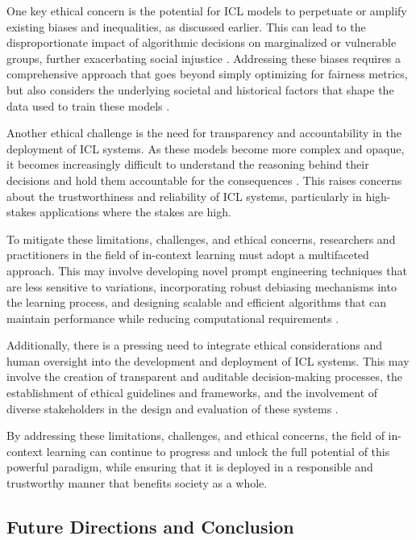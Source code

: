 \documentclass[11pt]{article}
\begin{document}
One key ethical concern is the potential for ICL models to perpetuate or amplify existing biases and inequalities, as discussed earlier. This can lead to the disproportionate impact of algorithmic decisions on marginalized or vulnerable groups, further exacerbating social injustice \cite{ref58,ref59}. Addressing these biases requires a comprehensive approach that goes beyond simply optimizing for fairness metrics, but also considers the underlying societal and historical factors that shape the data used to train these models \cite{ref60}.

Another ethical challenge is the need for transparency and accountability in the deployment of ICL systems. As these models become more complex and opaque, it becomes increasingly difficult to understand the reasoning behind their decisions and hold them accountable for the consequences \cite{ref61,ref62}. This raises concerns about the trustworthiness and reliability of ICL systems, particularly in high-stakes applications where the stakes are high.

To mitigate these limitations, challenges, and ethical concerns, researchers and practitioners in the field of in-context learning must adopt a multifaceted approach. This may involve developing novel prompt engineering techniques that are less sensitive to variations, incorporating robust debiasing mechanisms into the learning process, and designing scalable and efficient algorithms that can maintain performance while reducing computational requirements \cite{ref63,ref64}.

Additionally, there is a pressing need to integrate ethical considerations and human oversight into the development and deployment of ICL systems. This may involve the creation of transparent and auditable decision-making processes, the establishment of ethical guidelines and frameworks, and the involvement of diverse stakeholders in the design and evaluation of these systems \cite{ref65,ref66}.

By addressing these limitations, challenges, and ethical concerns, the field of in-context learning can continue to progress and unlock the full potential of this powerful paradigm, while ensuring that it is deployed in a responsible and trustworthy manner that benefits society as a whole.

\subsection{Future Directions and Conclusion}
\end{document}
